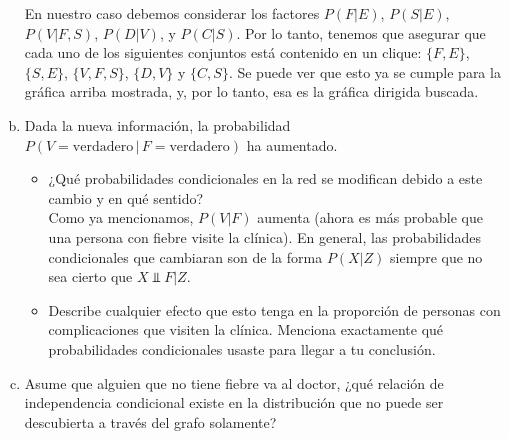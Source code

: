\documentclass[letterpaper,11pt]{article}
\begin{document}
\begin{enumerate}[a.]
    En nuestro caso debemos considerar los factores $P(F|E)$, $P(S|E)$, $P(V|F,S)$, $P(D|V)$, y $P(C|S)$. Por lo
    tanto, tenemos que asegurar que cada uno de los siguientes conjuntos  está contenido en un clique: $\{F,E\}$,
    $\{S,E\}$, $\{V,F,S\}$, $\{D,V\}$ y $\{C,S\}$. Se puede ver que esto ya se cumple para la gráfica arriba
    mostrada, y, por lo tanto, esa es la gráfica dirigida buscada. 

    \item Dada la nueva información, la probabilidad $P(V=\text{verdadero}\,|\,F=\text{verdadero})$ ha aumentado. 
    \begin{itemize}
        \item ¿Qué probabilidades condicionales en la red se modifican debido a este cambio y en qué sentido?\\
            Como ya mencionamos, $P(V|F)$ aumenta (ahora es más probable que una persona con fiebre visite la clínica).
            En general, las probabilidades condicionales que cambiaran son de la forma $P(X|Z)$ siempre que no sea
            cierto que $X\Perp F|Z$.  
        \item Describe cualquier efecto que esto tenga en la proporción de personas con complicaciones
        que visiten la clínica. Menciona exactamente qué probabilidades condicionales usaste para
        llegar a tu conclusión.
    \end{itemize}
    \item Asume que alguien que no tiene fiebre va al doctor, ¿qué relación de independencia condicional
existe en la distribución que no puede ser descubierta a través del grafo solamente?
\end{enumerate}
\end{document}
